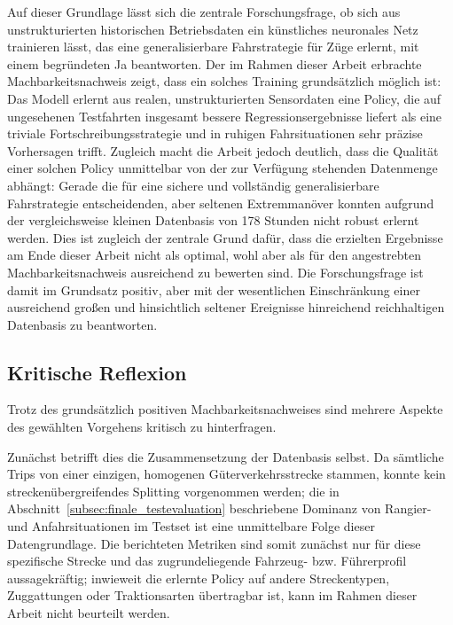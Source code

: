 Auf dieser Grundlage lässt sich die zentrale Forschungsfrage, ob sich aus unstrukturierten historischen Betriebsdaten ein künstliches neuronales Netz trainieren lässt, das eine generalisierbare Fahrstrategie für Züge erlernt, mit einem begründeten Ja beantworten. Der im Rahmen dieser Arbeit erbrachte Machbarkeitsnachweis zeigt, dass ein solches Training grundsätzlich möglich ist: Das Modell erlernt aus realen, unstrukturierten Sensordaten eine Policy, die auf ungesehenen Testfahrten insgesamt bessere Regressionsergebnisse liefert als eine triviale Fortschreibungsstrategie und in ruhigen Fahrsituationen sehr präzise Vorhersagen trifft. Zugleich macht die Arbeit jedoch deutlich, dass die Qualität einer solchen Policy unmittelbar von der zur Verfügung stehenden Datenmenge abhängt: Gerade die für eine sichere und vollständig generalisierbare Fahrstrategie entscheidenden, aber seltenen Extremmanöver konnten aufgrund der vergleichsweise kleinen Datenbasis von 178 Stunden nicht robust erlernt werden. Dies ist zugleich der zentrale Grund dafür, dass die erzielten Ergebnisse am Ende dieser Arbeit nicht als optimal, wohl aber als für den angestrebten Machbarkeitsnachweis ausreichend zu bewerten sind. Die Forschungsfrage ist damit im Grundsatz positiv, aber mit der wesentlichen Einschränkung einer ausreichend großen und hinsichtlich seltener Ereignisse hinreichend reichhaltigen Datenbasis zu beantworten.

\subsection{Kritische Reflexion}

Trotz des grundsätzlich positiven Machbarkeitsnachweises sind mehrere Aspekte des gewählten Vorgehens kritisch zu hinterfragen.

Zunächst betrifft dies die Zusammensetzung der Datenbasis selbst. Da sämtliche Trips von einer einzigen, homogenen Güterverkehrsstrecke stammen, konnte kein streckenübergreifendes Splitting vorgenommen werden; die in Abschnitt~\ref{subsec:finale_testevaluation} beschriebene Dominanz von Rangier- und Anfahrsituationen im Testset ist eine unmittelbare Folge dieser Datengrundlage. Die berichteten Metriken sind somit zunächst nur für diese spezifische Strecke und das zugrundeliegende Fahrzeug- bzw. Führerprofil aussagekräftig; inwieweit die erlernte Policy auf andere Streckentypen, Zuggattungen oder Traktionsarten übertragbar ist, kann im Rahmen dieser Arbeit nicht beurteilt werden.

